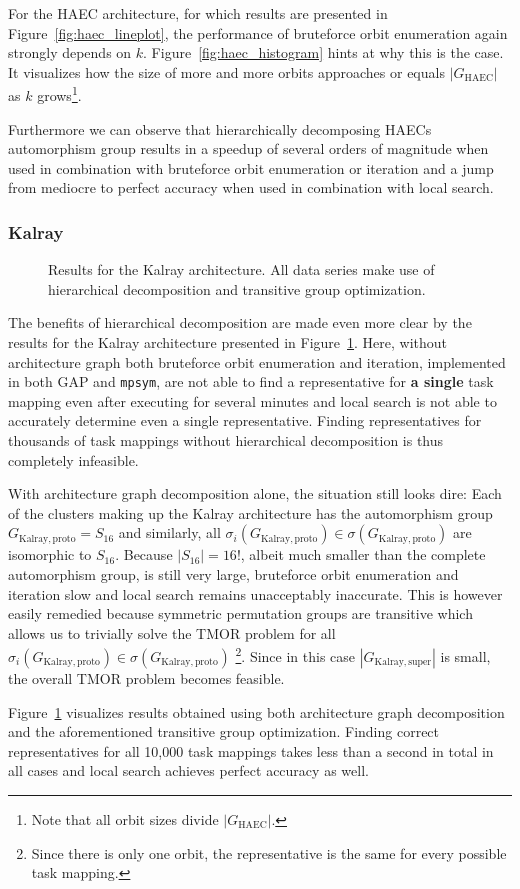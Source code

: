For the HAEC architecture, for which results are presented in
Figure~\ref{fig:haec_lineplot}, the performance of bruteforce orbit enumeration
again strongly depends on $k$. Figure~\ref{fig:haec_histogram} hints at why
this is the case. It visualizes how the size of more and more orbits approaches
or equals $|G_{\mathrm{HAEC}}|$ as $k$ grows\footnote{Note that all orbit sizes
divide $|G_{\mathrm{HAEC}}|$.}.

Furthermore we can observe that hierarchically decomposing HAECs automorphism
group results in a speedup of several orders of magnitude when used in
combination with bruteforce orbit enumeration or iteration and a jump from
mediocre to perfect accuracy when used in combination with local search.

\subsubsection{Kalray}

\begin{figure}
  \caption{Results for the Kalray architecture. All data series make use
           of hierarchical decomposition and transitive group optimization.}
  \label{fig:kalray_lineplot}
\end{figure}

The benefits of hierarchical decomposition are made even more clear by the
results for the Kalray architecture presented in
Figure~\ref{fig:kalray_lineplot}. Here, without architecture graph both
bruteforce orbit enumeration and iteration, implemented in both GAP and
\texttt{mpsym}, are not able to find a representative for \textbf{a single}
task mapping even after executing for several minutes and local search is not
able to accurately determine even a single representative. Finding
representatives for thousands of task mappings without hierarchical
decomposition is thus completely infeasible.

With architecture graph decomposition alone, the situation still looks dire:
Each of the clusters making up the Kalray architecture has the automorphism
group $G_{\mathrm{Kalray,proto}} = S_{16}$ and similarly, all
$\sigma_i(G_{\mathrm{Kalray,proto}}) \in \sigma(G_{\mathrm{Kalray,proto}})$ are
isomorphic to $S_{16}$.  Because $|S_{16}| = 16!$, albeit much smaller than the
complete automorphism group, is still very large, bruteforce orbit enumeration
and iteration slow and local search remains unacceptably inaccurate. This is
however easily remedied because symmetric permutation groups are transitive
which allows us to trivially solve the TMOR problem for all
$\sigma_i(G_{\mathrm{Kalray,proto}}) \in \sigma(G_{\mathrm{Kalray,proto}})$
\footnote{Since there is only one orbit, the representative is the same for
every possible task mapping.}. Since in this case $|G_{\mathrm{Kalray,super}}|$
is small, the overall TMOR problem becomes feasible.

Figure~\ref{fig:kalray_lineplot} visualizes results obtained using both
architecture graph decomposition and the aforementioned transitive group
optimization. Finding correct representatives for all 10,000 task mappings
takes less than a second in total in all cases and local search achieves
perfect accuracy as well.
